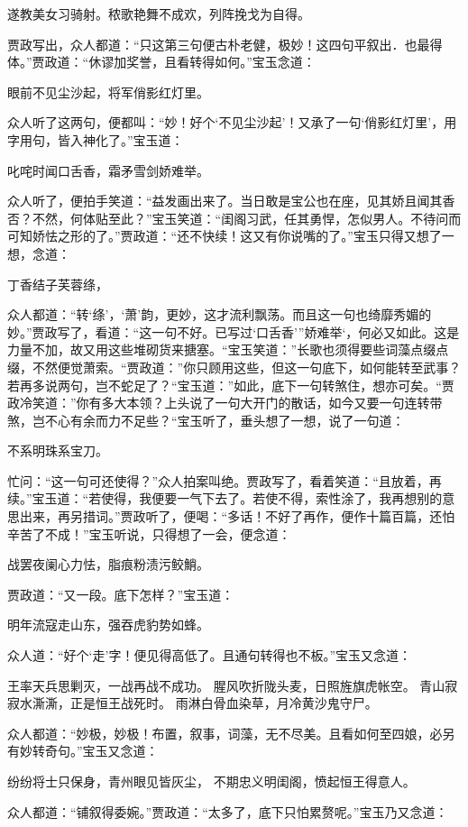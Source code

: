 \documentclass[12pt,oneside]{book}
\begin{document}
遂教美女习骑射。秾歌艳舞不成欢，列阵挽戈为自得。

贾政写出，众人都道：“只这第三句便古朴老健，极妙！这四句平叙出．也最得体。”贾政道：“休谬加奖誉，且看转得如何。”宝玉念道：

眼前不见尘沙起，将军俏影红灯里。

众人听了这两句，便都叫：“妙！好个‘不见尘沙起’！又承了一句‘俏影红灯里’，用字用句，皆入神化了。”宝玉道：

叱咤时闻口舌香，霜矛雪剑娇难举。

众人听了，便拍手笑道：“益发画出来了。当日敢是宝公也在座，见其娇且闻其香否？不然，何体贴至此？”宝玉笑道：“闺阁习武，任其勇悍，怎似男人。不待问而可知娇怯之形的了。”贾政道：“还不快续！这又有你说嘴的了。”宝玉只得又想了一想，念道：

丁香结子芙蓉绦，

众人都道：“转‘绦’，‘萧’韵，更妙，这才流利飘荡。而且这一句也绮靡秀媚的妙。”贾政写了，看道：“这一句不好。已写过‘口舌香’”娇难举‘，何必又如此。这是力量不加，故又用这些堆砌货来搪塞。“宝玉笑道：”长歌也须得要些词藻点缀点缀，不然便觉萧索。“贾政道：”你只顾用这些，但这一句底下，如何能转至武事？若再多说两句，岂不蛇足了？“宝玉道：”如此，底下一句转煞住，想亦可矣。“贾政冷笑道：”你有多大本领？上头说了一句大开门的散话，如今又要一句连转带煞，岂不心有余而力不足些？“宝玉听了，垂头想了一想，说了一句道：

不系明珠系宝刀。

忙问：“这一句可还使得？”众人拍案叫绝。贾政写了，看着笑道：“且放着，再续。”宝玉道：“若使得，我便要一气下去了。若使不得，索性涂了，我再想别的意思出来，再另措词。”贾政听了，便喝：“多话！不好了再作，便作十篇百篇，还怕辛苦了不成！”宝玉听说，只得想了一会，便念道：

战罢夜阑心力怯，脂痕粉渍污鲛鮹。

贾政道：“又一段。底下怎样？”宝玉道：

明年流寇走山东，强吞虎豹势如蜂。

众人道：“好个‘走’字！便见得高低了。且通句转得也不板。”宝玉又念道：

王率天兵思剿灭，一战再战不成功。
腥风吹折陇头麦，日照旌旗虎帐空。
青山寂寂水澌澌，正是恒王战死时。
雨淋白骨血染草，月冷黄沙鬼守尸。

众人都道：“妙极，妙极！布置，叙事，词藻，无不尽美。且看如何至四娘，必另有妙转奇句。”宝玉又念道：

纷纷将士只保身，青州眼见皆灰尘，
不期忠义明闺阁，愤起恒王得意人。

众人都道：“铺叙得委婉。”贾政道：“太多了，底下只怕累赘呢。”宝玉乃又念道：
\end{document}
